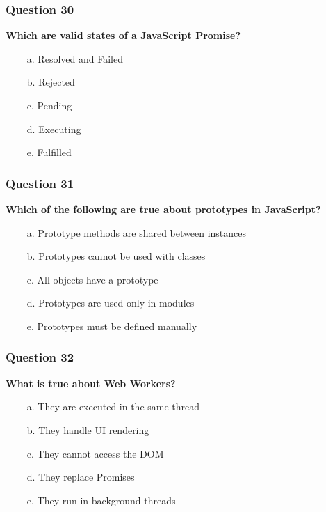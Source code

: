 \documentclass{article}
\newcommand{\cmark}{\textcolor{green}{\ding{51}}} %
\newcommand{\xmark}{\textcolor{red}{\ding{55}}}   %
\begin{document}
\subsubsection*{Question 30}
\textbf{Which are valid states of a JavaScript Promise?}

\begin{itemize}
  \item[\xmark\ a.] Resolved and Failed
  \item[\cmark\ b.] Rejected
  \item[\cmark\ c.] Pending
  \item[\xmark\ d.] Executing
  \item[\cmark\ e.] Fulfilled
\end{itemize}

\subsubsection*{Question 31}
\textbf{Which of the following are true about prototypes in JavaScript?}

\begin{itemize}
  \item[\cmark\ a.] Prototype methods are shared between instances
  \item[\xmark\ b.] Prototypes cannot be used with classes
  \item[\cmark\ c.] All objects have a prototype
  \item[\xmark\ d.] Prototypes are used only in modules
  \item[\xmark\ e.] Prototypes must be defined manually
\end{itemize}

\subsubsection*{Question 32}
\textbf{What is true about Web Workers?}

\begin{itemize}
  \item[\xmark\ a.] They are executed in the same thread
  \item[\xmark\ b.] They handle UI rendering
  \item[\cmark\ c.] They cannot access the DOM
  \item[\xmark\ d.] They replace Promises
  \item[\cmark\ e.] They run in background threads
\end{itemize}
\end{document}
